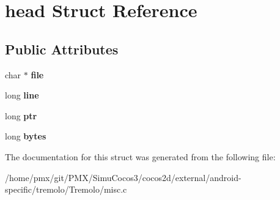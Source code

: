 \hypertarget{structhead}{}\section{head Struct Reference}
\label{structhead}
\subsection*{Public Attributes}
\begin{DoxyCompactItemize}
\item 
\mbox{\label{structhead_abf5182e027b25952e91b4512c6eff008}} 
char $\ast$ {\bfseries file}
\item 
\mbox{\label{structhead_a93ccc58c37821b46baa37800c796e1de}} 
long {\bfseries line}
\item 
\mbox{\label{structhead_a6ab30dd17abc5a2a73a99dc7ac9fba2a}} 
long {\bfseries ptr}
\item 
\mbox{\label{structhead_a90397e65e7748ca3f6369b7fbc8830af}} 
long {\bfseries bytes}
\end{DoxyCompactItemize}


The documentation for this struct was generated from the following file\+:\begin{DoxyCompactItemize}
\item 
/home/pmx/git/\+P\+M\+X/\+Simu\+Cocos3/cocos2d/external/android-\/specific/tremolo/\+Tremolo/misc.\+c\end{DoxyCompactItemize}
